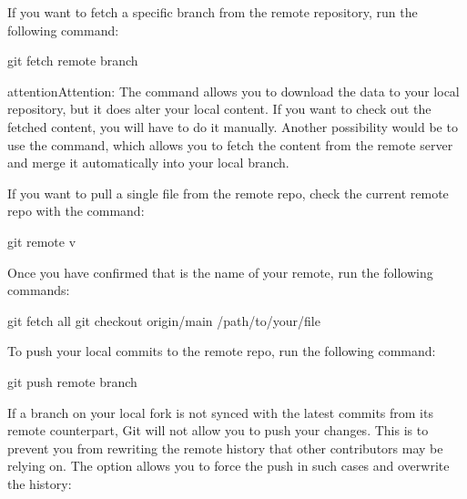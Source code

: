 \documentclass[a4paper,10pt,english,openany,oneside]{sphinxmanual}
\begin{document}
\sphinxAtStartPar
If you want to fetch a specific branch from the remote repository, run the following command:

\begin{sphinxVerbatim}[commandchars=\\\{\}]
\PYGZdl{} git fetch \PYGZlt{}remote\PYGZgt{} \PYGZlt{}branch\PYGZgt{}
\end{sphinxVerbatim}

\begin{sphinxadmonition}{attention}{Attention:}
\sphinxAtStartPar
The  command allows you to download the data to your local repository, but it does  alter your local content. If you want to check out the fetched content, you will have to do it manually. Another possibility would be to use the  command, which allows you to fetch the content from the remote server and merge it automatically into your local branch.
\end{sphinxadmonition}

\newpage

\sphinxAtStartPar
If you want to pull a single file from the remote repo, check the current remote repo with the command:

\begin{sphinxVerbatim}[commandchars=\\\{\}]
\PYGZdl{} git remote \PYGZhy{}v
\end{sphinxVerbatim}

\sphinxAtStartPar
Once you have confirmed that  is the name of your remote, run the following commands:

\begin{sphinxVerbatim}[commandchars=\\\{\}]
\PYGZdl{} git fetch \PYGZhy{}\PYGZhy{}all
\PYGZdl{} git checkout origin/main \PYGZhy{}\PYGZhy{} /path/to/your/file
\end{sphinxVerbatim}

\sphinxAtStartPar
To push your local commits to the remote repo, run the following command:

\begin{sphinxVerbatim}[commandchars=\\\{\}]
\PYGZdl{} git push \PYGZlt{}remote\PYGZgt{} \PYGZlt{}branch\PYGZgt{}
\end{sphinxVerbatim}

\sphinxAtStartPar
If a branch on your local fork is not synced with the latest commits from its remote counterpart, Git will not allow you to push your changes. This is to prevent you from rewriting the remote history that other contributors may be relying on. The  option allows you to force the push in such cases and overwrite the history:
\end{document}
